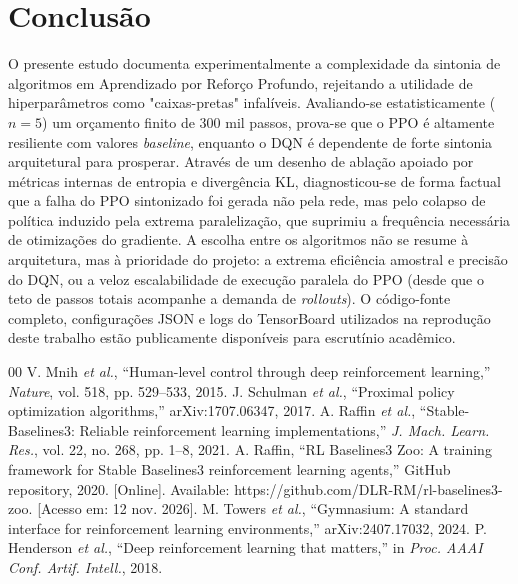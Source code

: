 \documentclass[conference]{IEEEtran}
\begin{document}
\section{Conclusão}

O presente estudo documenta experimentalmente a complexidade da sintonia de algoritmos em Aprendizado por Reforço Profundo, rejeitando a utilidade de hiperparâmetros como "caixas-pretas" infalíveis. Avaliando-se estatisticamente ($n=5$) um orçamento finito de 300 mil passos, prova-se que o PPO é altamente resiliente com valores \textit{baseline}, enquanto o DQN é dependente de forte sintonia arquitetural para prosperar. Através de um desenho de ablação apoiado por métricas internas de entropia e divergência KL, diagnosticou-se de forma factual que a falha do PPO sintonizado foi gerada não pela rede, mas pelo colapso de política induzido pela extrema paralelização, que suprimiu a frequência necessária de otimizações do gradiente. A escolha entre os algoritmos não se resume à arquitetura, mas à prioridade do projeto: a extrema eficiência amostral e precisão do DQN, ou a veloz escalabilidade de execução paralela do PPO (desde que o teto de passos totais acompanhe a demanda de \textit{rollouts}). O código-fonte completo, configurações JSON e logs do TensorBoard utilizados na reprodução deste trabalho estão publicamente disponíveis para escrutínio acadêmico.

\begin{thebibliography}{00}
 V. Mnih \textit{et al.}, ``Human-level control through deep reinforcement learning,'' \textit{Nature}, vol. 518, pp. 529--533, 2015.
 J. Schulman \textit{et al.}, ``Proximal policy optimization algorithms,'' arXiv:1707.06347, 2017.
 A. Raffin \textit{et al.}, ``Stable-Baselines3: Reliable reinforcement learning implementations,'' \textit{J. Mach. Learn. Res.}, vol. 22, no. 268, pp. 1--8, 2021.
 A. Raffin, ``RL Baselines3 Zoo: A training framework for Stable Baselines3 reinforcement learning agents,'' GitHub repository, 2020. [Online]. Available: https://github.com/DLR-RM/rl-baselines3-zoo. [Acesso em: 12 nov. 2026].
 M. Towers \textit{et al.}, ``Gymnasium: A standard interface for reinforcement learning environments,'' arXiv:2407.17032, 2024.
 P. Henderson \textit{et al.}, ``Deep reinforcement learning that matters,'' in \textit{Proc. AAAI Conf. Artif. Intell.}, 2018.
\end{thebibliography}
\end{document}
